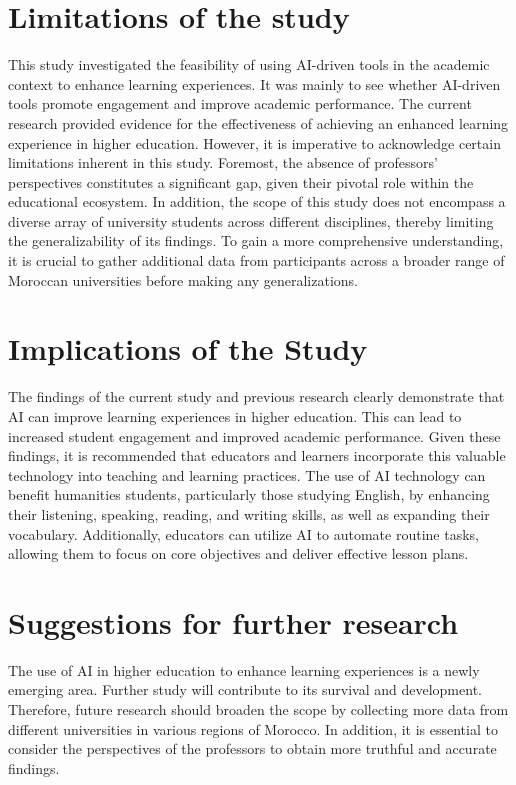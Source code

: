\section{Limitations of the study}
This study investigated the feasibility of using AI-driven tools in the academic context to enhance learning experiences.
It was mainly to see whether AI-driven tools promote engagement and improve academic performance.
The current research provided evidence for the effectiveness of achieving an enhanced learning experience in higher education.
 However, it is imperative to acknowledge certain limitations inherent in this study. 
Foremost, the absence of professors' perspectives constitutes a significant gap, 
given their pivotal role within the educational ecosystem. In addition,
the scope of this study does not encompass a diverse array of university 
students across different disciplines, thereby limiting the generalizability 
of its findings. To gain a more comprehensive understanding, 
it is crucial to gather additional data 
from participants across a broader range of Moroccan universities before making any generalizations.
\section{Implications of the Study}

The findings of the current study and previous research clearly demonstrate that AI can
improve learning experiences in higher education.
This can lead to increased student engagement and improved academic performance.
Given these findings, it is recommended that educators and learners incorporate this valuable
technology into teaching and learning practices. The use of AI technology can benefit humanities
students, particularly those studying English, by enhancing their listening, speaking, reading, 
and writing skills, as well as expanding their vocabulary. Additionally, educators can utilize 
AI to automate routine tasks, allowing them to focus on core objectives and deliver effective lesson plans.

\section{Suggestions for further research}

The use of AI in higher education to enhance learning experiences is a newly emerging area.
Further study will contribute to its survival and development.
Therefore, future research should broaden the scope by collecting more data 
from different universities in various regions of Morocco. 
In addition, it is essential to consider the perspectives of the professors to obtain more truthful and accurate findings.

